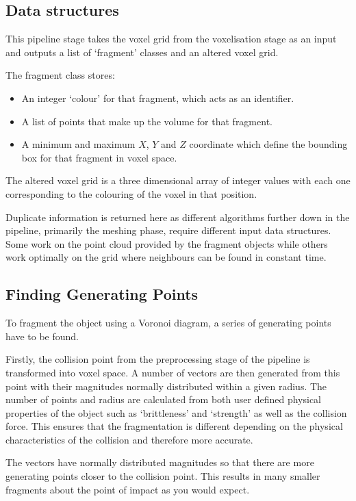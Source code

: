 \subsection{Data structures}

This pipeline stage takes the voxel grid from the voxelisation stage as an input and outputs a list of `fragment' classes and an altered voxel grid.

The fragment class stores:

\begin{itemize}
\item{An integer `colour' for that fragment, which acts as an identifier.}
\item{A list of points that make up the volume for that fragment.}
\item{A minimum and maximum $X$, $Y$ and $Z$ coordinate which define the bounding box for that fragment in voxel space.}
\end{itemize}

The altered voxel grid is a three dimensional array of integer values with each one corresponding to the colouring of the voxel in that position.

Duplicate information is returned here as different algorithms further down in the pipeline, primarily the meshing phase, require different input data structures. Some work on the point cloud provided by the fragment objects while others work optimally on the grid where neighbours can be found in constant time.

\subsection{Finding Generating Points}

To fragment the object using a Voronoi diagram, a series of generating points have to be found.

Firstly, the collision point from the preprocessing stage of the pipeline is transformed into voxel space. A number of vectors are then generated from this point with their magnitudes normally distributed within a given radius. The number of points and radius are calculated from both user defined physical properties of the object such as `brittleness' and `strength' as well as the collision force. This ensures that the fragmentation is different depending on the physical characteristics of the collision and therefore more accurate.

The vectors have normally distributed magnitudes so that there are more generating points closer to the collision point. This results in many smaller fragments about the point of impact as you would expect. 

